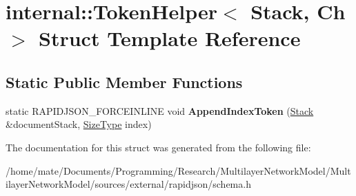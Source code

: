 \hypertarget{structinternal_1_1TokenHelper}{}\section{internal\+:\+:Token\+Helper$<$ Stack, Ch $>$ Struct Template Reference}
\label{structinternal_1_1TokenHelper}
\subsection*{Static Public Member Functions}
\begin{DoxyCompactItemize}
\item 
static R\+A\+P\+I\+D\+J\+S\+O\+N\+\_\+\+F\+O\+R\+C\+E\+I\+N\+L\+I\+NE void {\bfseries Append\+Index\+Token} (\hyperlink{classinternal_1_1Stack}{Stack} \&document\+Stack, \hyperlink{rapidjson_8h_a5ed6e6e67250fadbd041127e6386dcb5}{Size\+Type} index)\hypertarget{structinternal_1_1TokenHelper_a7b1864bfe6d4014ba7a5114acb26b3ae}{}\label{structinternal_1_1TokenHelper_a7b1864bfe6d4014ba7a5114acb26b3ae}

\end{DoxyCompactItemize}


The documentation for this struct was generated from the following file\+:\begin{DoxyCompactItemize}
\item 
/home/mate/\+Documents/\+Programming/\+Research/\+Multilayer\+Network\+Model/\+Multilayer\+Network\+Model/sources/external/rapidjson/schema.\+h\end{DoxyCompactItemize}
